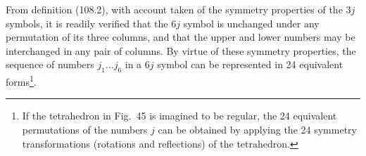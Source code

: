 From definition (108.2), with account taken of the symmetry properties of the $3j$ symbols, it is readily verified that the $6j$ symbol is unchanged under any permutation of its three columns, and that the upper and lower numbers may be interchanged in any pair of columns. By virtue of these symmetry properties, the sequence of numbers $j_1\ldots j_6$ in a $6j$ symbol can be represented in 24 equivalent forms\footnote{If the tetrahedron in Fig.~45 is imagined to be regular, the 24 equivalent permutations of the numbers $j$ can be obtained by applying the 24 symmetry transformations (rotations and reflections) of the tetrahedron.}.
